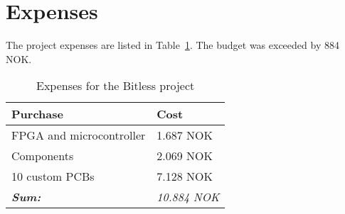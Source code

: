 \clearpage
\section{Expenses}
The project expenses are listed in Table~\ref{tab:budget}. The budget was exceeded by 884 NOK.

\begin{table}[H]
	\centering
	\begin{tabular}{|l|l|}
		\hline
		\textbf{Purchase} & \textbf{Cost} \\
		\hline
		\hline
		FPGA and microcontroller & 1.687 NOK\\
		\hline
		Components & 2.069 NOK\\
		\hline
		10 custom PCBs & 7.128 NOK \\
		\hline
		\hline
		\textbf{\textit{Sum:}} & \textit{10.884 NOK}\\
		\hline
	\end{tabular}
	\caption{Expenses for the Bitless project}
	\label{tab:budget}
\end{table}
